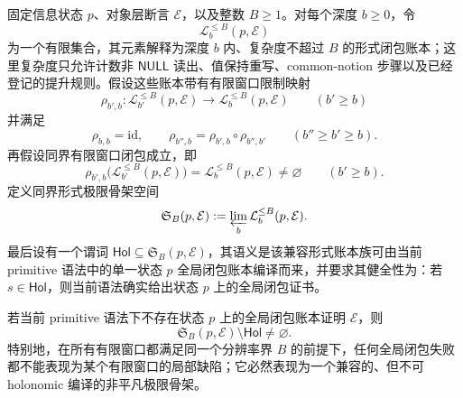 \begin{theorem}[同界有限窗口闭包失败的极限骨架判别]\label{distill:gromov-coarse_limit_obstruction_families-forcing-uniform-window-limit-skeleton}
固定信息状态 \(p\)、对象层断言 \(\mathcal E\)，以及整数 \(B\ge1\)。对每个深度 \(b\ge0\)，令
\[
\mathcal L_b^{\le B}(p,\mathcal E)
\]
为一个有限集合，其元素解释为深度 \(b\) 内、复杂度不超过 \(B\) 的形式闭包账本；这里复杂度只允许计数非 \(\mathsf{NULL}\) 读出、值保持重写、common-notion 步骤以及已经登记的提升规则。假设这些账本带有有限窗口限制映射
\[
\rho_{b',b}:\mathcal L_{b'}^{\le B}(p,\mathcal E)\longrightarrow
\mathcal L_b^{\le B}(p,\mathcal E)\qquad(b'\ge b)
\]
并满足
\[
\rho_{b,b}=\mathrm{id},\qquad
\rho_{b'',b}=\rho_{b',b}\circ\rho_{b'',b'}\qquad(b''\ge b'\ge b).
\]
再假设同界有限窗口闭包成立，即
\[
\rho_{b',b}\bigl(\mathcal L_{b'}^{\le B}(p,\mathcal E)\bigr)
=\mathcal L_b^{\le B}(p,\mathcal E)\ne\varnothing
\qquad(b'\ge b).
\]
定义同界形式极限骨架空间
\[
\mathfrak S_B(p,
\mathcal E):=\varprojlim_b\mathcal L_b^{\le B}(p,\mathcal E).
\]
最后设有一个谓词 \(\mathsf{Hol}\subseteq\mathfrak S_B(p,\mathcal E)\)，其语义是该兼容形式账本族可由当前 primitive 语法中的单一状态 \(p\) 全局闭包账本编译而来，并要求其健全性为：若 \(s\in\mathsf{Hol}\)，则当前语法确实给出状态 \(p\) 上的全局闭包证书。

若当前 primitive 语法下不存在状态 \(p\) 上的全局闭包账本证明 \(\mathcal E\)，则
\[
\mathfrak S_B(p,\mathcal E)\setminus\mathsf{Hol}\ne\varnothing.
\]
特别地，在所有有限窗口都满足同一个分辨率界 \(B\) 的前提下，任何全局闭包失败都不能表现为某个有限窗口的局部缺陷；它必然表现为一个兼容的、但不可 holonomic 编译的非平凡极限骨架。
\end{theorem}

